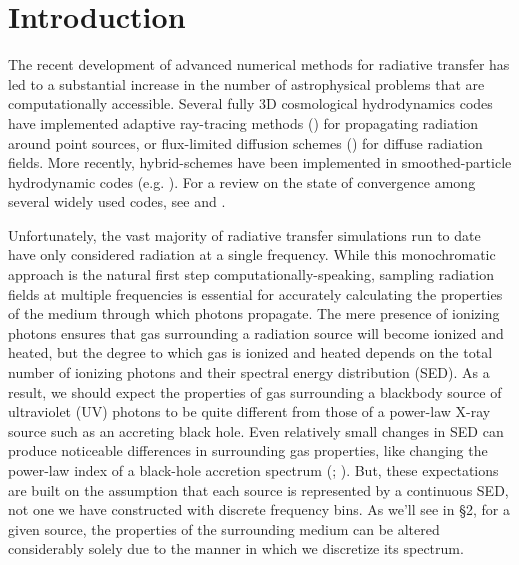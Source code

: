 \documentclass[preprint2]{aastex}              %
\begin{document}
\section{Introduction}
The recent development of advanced numerical methods for radiative transfer has led to a substantial increase in the number of astrophysical problems that are computationally accessible.   Several fully 3D cosmological hydrodynamics codes have implemented adaptive ray-tracing methods (\cite{Abel2002}) for propagating radiation around point sources,  or flux-limited diffusion schemes (\cite{Reynolds2009}) for diffuse radiation fields.  More recently, hybrid-schemes have been implemented in smoothed-particle hydrodynamic codes (e.g. \cite{Petkova2011}).  For a review on the state of convergence among several widely used codes, see \cite{Iliev2006} and \cite{Iliev2009}.

Unfortunately, the vast majority of radiative transfer simulations run to date have only considered radiation at a single frequency.  While this monochromatic approach is the natural first step computationally-speaking, sampling radiation fields at multiple frequencies is essential for accurately calculating the properties of the medium through which photons propagate.  The mere presence of ionizing photons ensures that gas surrounding a radiation source will become ionized and heated, but the degree to which gas is ionized and heated depends on the total number of ionizing photons and their spectral energy distribution (SED).  As a result, we should expect the properties of gas surrounding a blackbody source of ultraviolet (UV) photons to be quite different from those of a power-law X-ray source such as an accreting black hole.  Even relatively small changes in SED can produce noticeable differences in surrounding gas properties, like changing the power-law index of a black-hole accretion spectrum (\cite{Kuhlen2005}; \cite{Thomas2008}).  But, these expectations are built on the assumption that each source is represented by a continuous SED, not one we have constructed with \nnu discrete frequency bins.  As we'll see in \S2, for a given source, the properties of the surrounding medium can be altered considerably solely due to the manner in which we discretize its spectrum.
\end{document}
